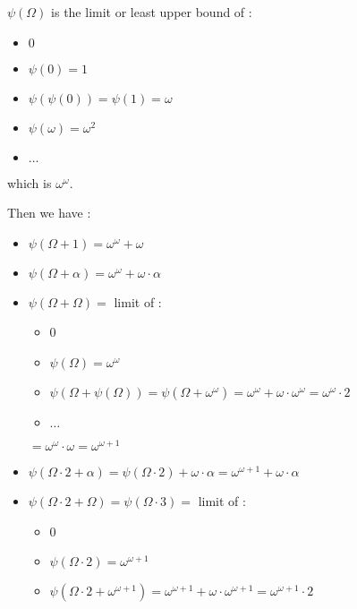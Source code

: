 \documentclass[10pt]{article}
\begin{document}
\( \psi(\Omega) \) is the limit or least upper bound of :

\begin{itemize}
     \setlength{\itemsep}{1pt}
     \setlength{\parskip}{0pt}
     \setlength{\parsep}{0pt}
\item \( 0 \)
\item \( \psi(0) = 1 \)
\item \( \psi(\psi(0)) = \psi(1) = \omega \)
\item \( \psi(\omega) = \omega^2 \)
\item \( \ldots \)
\end{itemize}

which is \( \omega^\omega \).

Then we have :

\begin{itemize}
     \setlength{\itemsep}{1pt}
     \setlength{\parskip}{0pt}
     \setlength{\parsep}{0pt}
\item \( \psi(\Omega+1) = \omega^\omega+\omega \)
\item \( \psi(\Omega+\alpha) = \omega^\omega+\omega \cdot \alpha \)
\item \( \psi(\Omega+\Omega) = \) limit of : 
   \begin{itemize}
     \setlength{\itemsep}{1pt}
     \setlength{\parskip}{0pt}
     \setlength{\parsep}{0pt}
   \item 0
   \item \( \psi(\Omega) = \omega^\omega \)
   \item \( \psi(\Omega+\psi(\Omega)) = \psi(\Omega+\omega^\omega) = \omega^\omega+\omega \cdot \omega^\omega = \omega^\omega \cdot 2 \)
   \item \( \ldots \)
   \end{itemize}
   \( = \omega^\omega \cdot \omega = \omega^{\omega+1} \)
\item \( \psi(\Omega \cdot 2 + \alpha) = \psi(\Omega \cdot 2) + \omega \cdot \alpha = \omega^{\omega+1} + \omega \cdot \alpha \)
\item \( \psi(\Omega \cdot 2 + \Omega) = \psi(\Omega \cdot 3) = \) limit of : 
   \begin{itemize}
     \setlength{\itemsep}{1pt}
     \setlength{\parskip}{0pt}
     \setlength{\parsep}{0pt}
   \item 0
   \item \( \psi(\Omega \cdot 2) = \omega^{\omega+1} \)
   \item \( \psi(\Omega \cdot 2 + \omega^{\omega+1}) = \omega^{\omega+1} + \omega \cdot \omega^{\omega+1} = \omega^{\omega+1} \cdot 2 \)

\end{itemize}
\end{itemize}
\end{document}

